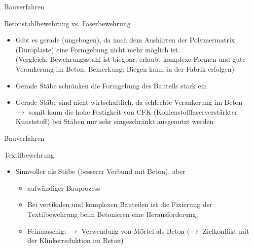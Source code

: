 \begin{frame}{Bauverfahren}
    \begin{block}{Betonstahlbewehrung vs. Faserbewehrung}
        \begin{itemize}
            \item [\textbullet] Gibt es gerade (ungebogen), da nach dem Aushärten der Polymermatrix (Duroplaste) eine Formgebung nicht mehr möglich ist. \\ (Vergleich: Bewehrungsstahl ist biegbar, erlaubt komplexe Formen und gute Verankerung im Beton, Bemerkung: Biegen kann in der Fabrik erfolgen)
            \item [\textbullet]Gerade Stäbe schränken die Formgebung des Bauteils stark ein
            \item [\textbullet]Gerade Stäbe sind nicht wirtschaftlich, da schlechte Verankerung im Beton $\rightarrow$ somit kann die hohe Festigkeit von CFK (Kohlenstofffaserverstärkter Kunststoff) bei Stäben nur sehr eingeschränkt ausgenutzt werden
        \end{itemize}
    \end{block}

\end{frame}

\begin{frame}{Bauverfahren}
    \begin{block}{Textilbewehrung}
        \begin{itemize}
            \item [\textbullet]  Sinnvoller als Stäbe (besserer Verbund mit Beton), aber
                  \begin{itemize}
                      \item [\textbullet]  aufwändiger Bauprozess
                      \item [\textbullet]  Bei vertikalen und komplexen Bauteilen ist die Fixierung der Textilbewehrung beim Betonieren eine Herausforderung
                      \item[\textbullet] Feinmaschig: $\rightarrow$ Verwendung von Mörtel als Beton ($\rightarrow$ Zielkonflikt mit der Klinkerreduktion im Beton)
                  \end{itemize}
        \end{itemize}
    \end{block}
\end{frame}

